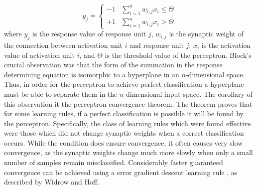 \documentclass[11pt]{afthesis}
\begin{document}
	\begin{equation} 
	y_j = \begin{cases}
	-1 &\sum_{i=1}^{n} w_{i,j}x_{i} \leq \Theta\\
	+1 &\sum_{i=1}^{n} w_{i,j}x_{i} > \Theta
	\end{cases}
	\end{equation} where \begin{math} y_j \end{math} is the response value of response unit \begin{math} j \end{math}, \begin{math} w_{i,j} \end{math} is the synaptic weight of the connection between activation unit \begin{math} i \end{math} and response unit \begin{math} j \end{math}, \begin{math} x_{i} \end{math} is the activation value of activation unit \begin{math} i \end{math}, and \begin{math} \Theta \end{math} is the threshold value of the perceptron. Block's crucial observation was that the form of the summation in the response determining equation is isomorphic to a hyperplane in an \begin{math}n\end{math}-dimensional space. Thus, in order for the perceptron to achieve perfect classification a hyperplane must be able to separate them in the \begin{math}n\end{math}-dimensional input space. The corollary of this observation it the perceptron convergence theorem. The theorem proves that for some learning rules, if a perfect classification is possible it will be found by the perceptron. Specifically, the class of learning rules which were found effective were those which did not change synaptic weights when a correct classification occurs. While the condition does ensure convergence, it often causes very slow convergence, as the synaptic weights change much more slowly when only a small number of samples remain misclassified. Considerably faster guaranteed convergence can be achieved using a error gradient descent learning rule \cite{widrow1960asc}, as described by Widrow and Hoff. 
	
\end{document}
